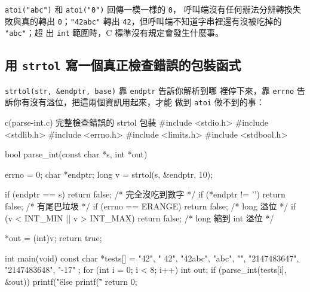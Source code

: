 
\texttt{atoi("abc")} 和 \texttt{atoi("0")} 回傳一模一樣的 \texttt{0}，
呼叫端沒有任何辦法分辨轉換失敗與真的轉出 \texttt{0}；\texttt{"42abc"}
轉出 \texttt{42}，但呼叫端不知道字串裡還有沒被吃掉的 \texttt{"abc"}；超
出 \texttt{int} 範圍時，C 標準沒有規定會發生什麼事。

\subsection[strtol 錯誤檢查包裝函式]{用 \texttt{strtol} 寫一個真正檢查錯誤的包裝函式}

\texttt{strtol(str, \&endptr, base)} 靠 \texttt{endptr} 告訴你解析到哪
裡停下來，靠 \texttt{errno} 告訴你有沒有溢位，把這兩個資訊用起來，才能
做到 \texttt{atoi} 做不到的事：

\begin{example}{c}{(parse-int.c) 完整檢查錯誤的 strtol 包裝}
#include <stdio.h>
#include <stdlib.h>
#include <errno.h>
#include <limits.h>
#include <stdbool.h>

bool parse_int(const char *s, int *out) {
    errno = 0;
    char *endptr;
    long v = strtol(s, &endptr, 10);

    if (endptr == s) return false;       /* 完全沒吃到數字 */
    if (*endptr != '\0') return false;   /* 有尾巴垃圾 */
    if (errno == ERANGE) return false;   /* long 溢位 */
    if (v < INT_MIN || v > INT_MAX) return false; /* long 縮到 int 溢位 */

    *out = (int)v;
    return true;
}

int main(void) {
    const char *tests[] = {
        "42", "  42", "42abc", "abc", "",
        "2147483647", "2147483648", "-17"
    };
    for (int i = 0; i < 8; i++) {
        int out;
        if (parse_int(tests[i], &out))
            printf("\"%
        else
            printf("\"%
    }
    return 0;
}
\end{example}


